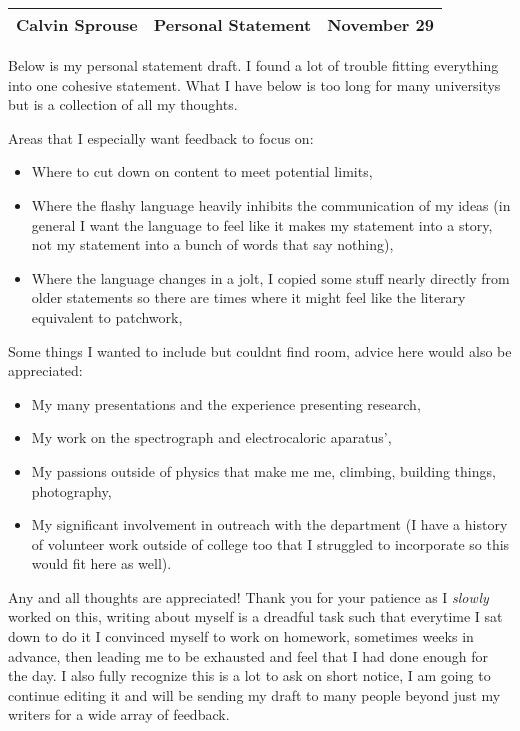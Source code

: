 \documentclass[a4paper, 12pt]{../../config/homework}
\begin{document}
\noindent
\begin{tabularx}{\textwidth}{>{\centering\arraybackslash}X>{\centering\arraybackslash}X>{\centering\arraybackslash}X}
\toprule
Calvin Sprouse & Personal Statement & 2023 November 29\\
\midrule
\end{tabularx}

Below is my personal statement draft. I found a lot of trouble fitting everything into one cohesive statement. What I have below is too long for many universitys but is a collection of all my thoughts.

Areas that I especially want feedback to focus on:
\begin{itemize}
    \item Where to cut down on content to meet potential limits,
    \item Where the flashy language heavily inhibits the communication of my ideas (in general I want the language to feel like it makes my statement into a story, not my statement into a bunch of words that say nothing),
    \item Where the language changes in a jolt, I copied some stuff nearly directly from older statements so there are times where it might feel like the literary equivalent to patchwork,
\end{itemize}

Some things I wanted to include but couldnt find room, advice here would also be appreciated:
\begin{itemize}
    \item My many presentations and the experience presenting research,
    \item My work on the spectrograph and electrocaloric aparatus',
    \item My passions outside of physics that make me me, climbing, building things, photography,
    \item My significant involvement in outreach with the department (I have a history of volunteer work outside of college too that I struggled to incorporate so this would fit here as well).
\end{itemize}

Any and all thoughts are appreciated! Thank you for your patience as I \textit{slowly} worked on this, writing about myself is a dreadful task such that everytime I sat down to do it I convinced myself to work on homework, sometimes weeks in advance, then leading me to be exhausted and feel that I had done enough for the day. I also fully recognize this is a lot to ask on short notice, I am going to continue editing it and will be sending my draft to many people beyond just my writers for a wide array of feedback.
\end{document}
